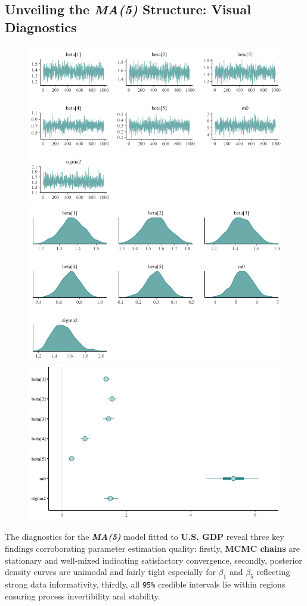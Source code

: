 \documentclass{Configuration_Files/PoliMi3i_thesis}
\begin{document}
\newpage
\subsection{Unveiling the \textbf{\textit{MA(5)}} Structure: Visual Diagnostics}
\begin{figure}[H]
    \centering
    \includegraphics[width=0.55\linewidth]{GDP_MA(5)_TRACE1.png}
    \vspace{0.5em}
    
    \includegraphics[width=0.55\linewidth]{GDP_MA(5)_DENSITY1.png}
    \vspace{0.5em}
    
    \includegraphics[width=0.55\linewidth]{GDP_MA(5)_INTERVAL1.png}
\end{figure}

The diagnostics for the \textbf{\textit{MA(5)}} model fitted to \textbf{U.S. GDP} reveal three key findings corroborating parameter estimation quality: firstly, \textbf{MCMC chains} are stationary and well‐mixed indicating satisfactory convergence, secondly, posterior density curves are unimodal and fairly tight especially for $\beta_1$ and $\beta_5$ reflecting strong data informativity, thirdly, all \texttt{95\%}  credible intervals lie within regions ensuring process invertibility and stability.
\end{document}
